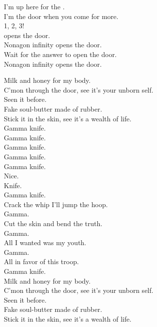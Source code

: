 I'm up here for the . \\
I'm the door when you come for more. \\

1, 2, 3! \\

 opens the door. \\
Nonagon infinity opens the door. \\
Wait for the answer to open the door. \\
Nonagon infinity opens the door. \\




Milk and honey for my body. \\
C'mon through the door, see it's your unborn self. \\
Seen it before. \\
Fake soul-butter made of rubber. \\
Stick it in the skin, see it's a wealth of life. \\

Gamma knife. \\
Gamma knife. \\
Gamma knife. \\
Gamma knife. \\

Gamma knife. \\
Nice. \\
Knife. \\
Gamma knife. \\

Crack the whip I'll jump the hoop. \\
Gamma. \\
Cut the skin and bend the truth. \\
Gamma. \\
All I wanted was my youth. \\
Gamma. \\
All in favor of this troop. \\
Gamma knife. \\

Milk and honey for my body. \\
C'mon through the door, see it's your unborn self. \\
Seen it before. \\
Fake soul-butter made of rubber. \\
Stick it in the skin, see it's a wealth of life. \\

